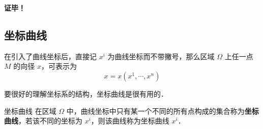 \textbf{证毕！}
\subsection{坐标曲线}
在引入了曲线坐标后，直接记 $x^i$ 为曲线坐标而不带撇号，那么区域 $\Omega$ 上任一点 $M$ 的向径 $x$，可表示为
\begin{equation}
x=x(x^1,\cdots,x^n)
\end{equation}

要很好的理解坐标系的结构，坐标曲线是很有用的．
\begin{definition}{坐标曲线}
在区域 $\Omega$ 中，曲线坐标中只有某一个不同的所有点构成的集合称为\textbf{坐标曲线}，若该不同的坐标为 $x^i$，则该曲线称为坐标曲线 $x^i$．
\end{definition}